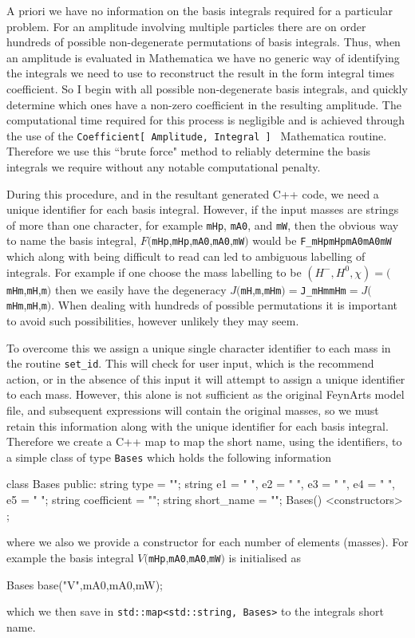A priori we have no information on the basis integrals required for a particular problem.  For an amplitude involving multiple particles there are on order hundreds of possible non-degenerate permutations of basis integrals.  Thus, when an amplitude is evaluated in Mathematica we have no generic way of identifying the integrals we need to use to reconstruct the result in the form integral times coefficient.  So I begin with all possible non-degenerate basis integrals, and quickly determine which ones have a non-zero coefficient in the resulting amplitude.  The computational time required for this process is negligible and is achieved through the use of the \lstinline{Coefficient[ Amplitude, Integral ] } Mathematica routine.  Therefore we use this ``brute force" method to reliably determine the basis integrals we require without any notable computational penalty.

During this procedure, and in the resultant generated C++ code, we need a unique identifier for each basis integral.  However, if the input masses are strings of more than one character, for example \lstinline{mHp}, \lstinline{mA0}, and \lstinline{mW}, then the obvious way to name the basis integral, $F($\lstinline{mHp},\lstinline{mHp},\lstinline{mA0},\lstinline{mA0},\lstinline{mW}$)$ would be \lstinline{F_mHpmHpmA0mA0mW} which along with being difficult to read can led to ambiguous labelling of integrals.  For example if one choose the mass labelling to be $(H^-, H^0, \chi ) = ($\lstinline{mHm},\lstinline{mH},\lstinline{m}$)$ then we easily have the degeneracy $J($\lstinline{mH},\lstinline{m},\lstinline{mHm}$) =  $\lstinline{J_mHmmHm}$ = J($\lstinline{mHm},\lstinline{mH},\lstinline{m}$)$.  When dealing with hundreds of possible permutations it is important to avoid such possibilities, however unlikely they may seem.

To overcome this we assign a unique single character identifier to each mass in the routine \lstinline{set_id}.  This will check for user input, which is the recommend action, or in the absence of this input it will attempt to assign a unique identifier to each mass.  However, this alone is not sufficient as the original FeynArts model file, and subsequent expressions will contain the original masses, so we must retain this information along with the unique identifier for each basis integral.  Therefore we create a C++ map to map the short name, using the identifiers, to a simple class of type \lstinline{Bases} which holds the following information
\begin{lstcpp}
class Bases
{
public:
string type = "";
string e1 = " ", e2 = " ", e3 = " ", e4 = " ", e5 = " ";
string coefficient = "";
string short_name = "";
Bases() {}
<constructors>
};
\end{lstcpp}
where we also we provide a constructor for each number of elements (masses).  For example the basis integral $V($\lstinline{mHp},\lstinline{mA0},\lstinline{mA0},\lstinline{mW}$)$ is initialised as\begin{lstcpp}
Bases base("V",mA0,mA0,mW);
\end{lstcpp}
which we then save in \lstinline{std::map<std::string, Bases>} to the integrals short name.

